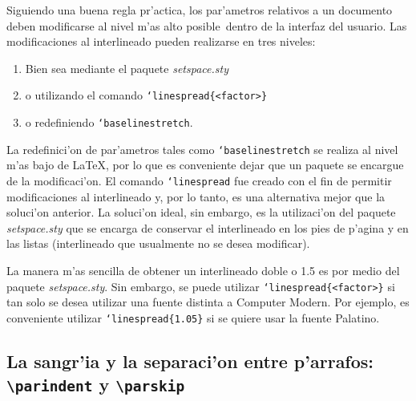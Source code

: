 \documentclass[11pt,a4paper,pagesize,tablecaptionabove,abstracton,pointlessnumbers]{scrartcl}
\newcommand{\gl}{\guillemotleft}
\newcommand{\gr}{\guillemotright}
\newcommand{\Paket}[1]{\textsf{\textsl{#1.sty}}\xspace}
\DeclareRobustCommand*{\Macro}[1]{\mbox{\texttt{\char`\\#1}}}
\DeclareRobustCommand*{\LMacro}[2]{\mbox{\texttt{\char`\\#1\{#2\}}}}
\begin{document}
Siguiendo una buena regla pr'actica, los par'ametros relativos a un documento deben modificarse al nivel \gl m'as alto posible\gr\ dentro de la interfaz del usuario. Las modificaciones al interlineado pueden realizarse en tres niveles:
\begin{enumerate}
  \item Bien sea mediante el paquete \Paket{setspace}
  \item o utilizando el comando \LMacro{linespread}{<factor>}
  \item o redefiniendo \Macro{baselinestretch}.
\end{enumerate}
La redefinici'on de par'ametros tales como \Macro{baselinestretch} se realiza al nivel m'as bajo de \LaTeX{}, por lo que es conveniente dejar que un paquete se encargue de la modificaci'on. El comando \Macro{linespread} fue creado con el fin de permitir modificaciones al interlineado y, por lo tanto, es una alternativa mejor que la soluci'on anterior. La soluci'on ideal, sin embargo, es la utilizaci'on del paquete \Paket{setspace} que se encarga de conservar el interlineado en los pies de p'agina y en las listas (interlineado que usualmente no se desea modificar).

La manera m'as sencilla de obtener un interlineado doble o 1.5 es por medio del paquete \Paket{setspace}. Sin embargo, se puede utilizar \LMacro{linespread}{<factor>} si tan solo se desea utilizar una fuente distinta a Computer Modern. Por ejemplo, es conveniente utilizar \LMacro{linespread}{1.05} si se quiere usar la fuente Palatino.

\subsection{La sangr'ia y la separaci'on entre p'arrafos: \texttt{\textbackslash{}parindent} y \texttt{\textbackslash{}parskip}}
\label{sec:absatz-und-abst}
\end{document}
